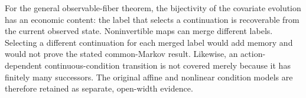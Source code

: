 For the general observable-fiber theorem, the bijectivity of the covariate evolution has an economic content: the label that selects a continuation is recoverable from the current observed state. Noninvertible maps can merge different labels. Selecting a different continuation for each merged label would add memory and would not prove the stated common-Markov result. Likewise, an action-dependent continuous-condition transition is not covered merely because it has finitely many successors. The original affine and nonlinear condition models are therefore retained as separate, open-width evidence.
